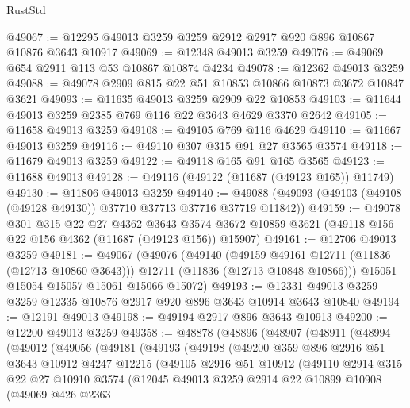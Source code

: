 \begin{lexlean}{RustStd}
\begin{coremodule}
@49067 := @12295 @49013 @3259 @3259 @2912 @2917 @920 @896 @10867 @10876 @3643 @10917
@49069 := @12348 @49013 @3259
@49076 := @49069 @654 @2911 @113 @53 @10867 @10874 @4234
@49078 := @12362 @49013 @3259
@49088 := @49078 @2909 @815 @22 @51 @10853 @10866 @10873 @3672 @10847 @3621
@49093 := @11635 @49013 @3259 @2909 @22 @10853
@49103 := @11644 @49013 @3259 @2385 @769 @116 @22 @3643 @4629 @3370 @2642
@49105 := @11658 @49013 @3259
@49108 := @49105 @769 @116 @4629
@49110 := @11667 @49013 @3259
@49116 := @49110 @307 @315 @91 @27 @3565 @3574
@49118 := @11679 @49013 @3259
@49122 := @49118 @165 @91 @165 @3565
@49123 := @11688 @49013
@49128 := @49116 (@49122 (@11687 (@49123 @165)) @11749)
@49130 := @11806 @49013 @3259
@49140 := @49088 (@49093 (@49103 (@49108 (@49128 @49130)) @37710 @37713 @37716 @37719 @11842))
@49159 := @49078
    @301
    @315
    @22
    @27
    @4362
    @3643
    @3574
    @3672
    @10859
    @3621
    (@49118 @156 @22 @156 @4362 (@11687 (@49123 @156)) @15907)
@49161 := @12706 @49013 @3259
@49181 := @49067
    (@49076
      (@49140
        (@49159 @49161 @12711 (@11836 (@12713 @10860 @3643)))
        @12711
        (@11836 (@12713 @10848 @10866)))
      @15051
      @15054
      @15057
      @15061
      @15066
      @15072)
@49193 := @12331 @49013 @3259 @3259 @12335 @10876 @2917 @920 @896 @3643 @10914 @3643 @10840
@49194 := @12191 @49013
@49198 := @49194 @2917 @896 @3643 @10913
@49200 := @12200 @49013 @3259
@49358 := @48878
    (@48896
      (@48907
        (@48911
          (@48994
            (@49012
              (@49056
                (@49181
                  (@49193
                    (@49198
                      (@49200
                        @359
                        @896
                        @2916
                        @51
                        @3643
                        @10912
                        @4247
                        @12215
                        (@49105
                          @2916
                          @51
                          @10912
                          (@49110
                            @2914
                            @315
                            @22
                            @27
                            @10910
                            @3574
                            (@12045
                              @49013
                              @3259
                              @2914
                              @22
                              @10899
                              @10908
                              (@49069
                                @426
                                @2363

\end{coremodule}
\end{lexlean}
